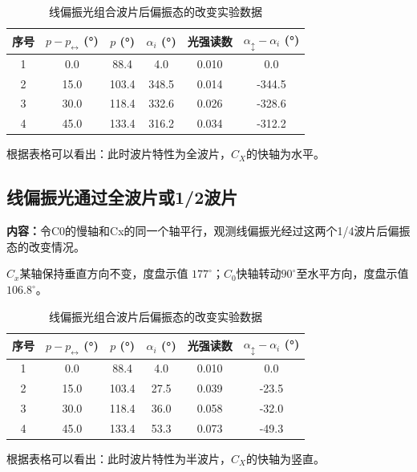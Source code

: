 \documentclass[UTF8]{ctexart}
\begin{document}
\begin{table}[h]
    \centering
    \begin{tabular}{|c|c|c|c|c|c|}
    \hline
        序号 & $p-p_{\leftrightarrow}$ (°) & $p$ (°) & $\alpha_i$ (°) & 光强读数 & $\alpha_{\updownarrow}-\alpha_i$ (°) \\
        \hline
        1 & 0.0 & 88.4 & 4.0 & 0.010 & 0.0 \\ \hline
        2 & 15.0 & 103.4 & 348.5 & 0.014 & -344.5 \\ \hline
        3 & 30.0 & 118.4 & 332.6 & 0.026 & -328.6 \\ \hline
        4 & 45.0 & 133.4 & 316.2 & 0.034 & -312.2 \\ \hline
    \end{tabular}
    \caption{线偏振光组合波片后偏振态的改变实验数据}
    \label{tab:1.9.1}
\end{table}

根据表格可以看出：此时波片特性为全波片，$C_X$的快轴为水平。

\subsection{线偏振光通过全波片或1/2波片}

\textbf{内容：}令C0的慢轴和Cx的同一个轴平行，观测线偏振光经过这两个1/4波片后偏振态的改变情况。

$C_x$某轴保持垂直方向不变，度盘示值 $177^{\circ}$；$C_0$快轴转动$90^{\circ}$至水平方向，度盘示值 $106.8^{\circ}$。

\begin{table}[h]
    \centering
    \begin{tabular}{|c|c|c|c|c|c|}
    \hline
        序号 & $p-p_{\leftrightarrow}$ (°) & $p$ (°) & $\alpha_i$ (°) & 光强读数 & $\alpha_{\updownarrow}-\alpha_i$ (°) \\
        \hline
        1 & 0.0 & 88.4 & 4.0 & 0.010 & 0.0 \\ \hline
        2 & 15.0 & 103.4 & 27.5 & 0.039 & -23.5 \\ \hline
        3 & 30.0 & 118.4 & 36.0 & 0.058 & -32.0 \\ \hline
        4 & 45.0 & 133.4 & 53.3 & 0.073 & -49.3 \\ \hline
    \end{tabular}
    \caption{线偏振光组合波片后偏振态的改变实验数据}
    \label{tab:1.10.1}
\end{table}

根据表格可以看出：此时波片特性为半波片，$C_X$的快轴为竖直。
\end{document}
